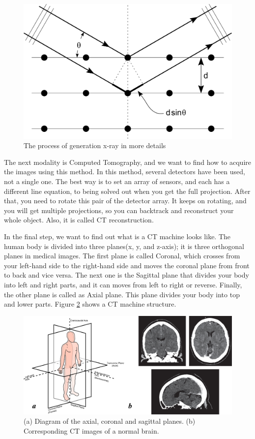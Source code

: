 \begin{figure}[htbp]
	\centering \includegraphics[width=0.7\columnwidth]{./figures/Fig7.png}
	\caption{The process of generation x-ray in more details}
	\label{fig7}
\end{figure}

The next modality is Computed Tomography, and we want to find how to acquire the images using this method. In this method, several detectors have been used, not a single one. The best way is to set an array of sensors, and each has a different line equation, to being solved out when you get the full projection. After that, you need to rotate this pair of the detector array. It keeps on rotating, and you will get multiple projections, so you can backtrack and reconstruct your whole object. Also, it is called CT reconstruction. 

In the final step, we want to find out what is a CT machine looks like. The human body is divided into three planes(x, y, and z-axis); it is three orthogonal planes in medical images. The first plane is called Coronal, which crosses from your left-hand side to the right-hand side and moves the coronal plane from front to back and vice versa. The next one is the Sagittal plane that divides your body into left and right parts, and it can moves from left to right or reverse. Finally, the other plane is called as Axial plane. This plane divides your body into top and lower parts. Figure \ref{fig8} shows a CT machine structure.

\begin{figure}[htbp]
	\centering \includegraphics[width=0.85\columnwidth]{./figures/Fig8.png}
	\caption{(a) Diagram of the axial, coronal and sagittal planes. (b) Corresponding CT images of a normal brain.}
	\label{fig8}
\end{figure}


